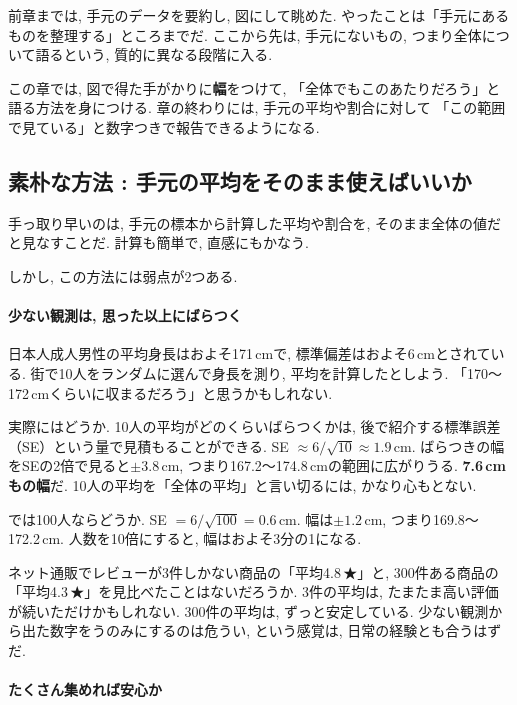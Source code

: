     前章までは, 手元のデータを要約し, 図にして眺めた.
    やったことは「手元にあるものを整理する」ところまでだ.
    ここから先は, 手元にないもの, つまり全体について語るという, 質的に異なる段階に入る.

    この章では, 図で得た手がかりに\textbf{幅}をつけて,
    「全体でもこのあたりだろう」と語る方法を身につける.
    章の終わりには, 手元の平均や割合に対して
    「この範囲で見ている」と数字つきで報告できるようになる.


  \subsection{素朴な方法 : 手元の平均をそのまま使えばいいか}

    手っ取り早いのは, 手元の標本から計算した平均や割合を, そのまま全体の値だと見なすことだ.
    計算も簡単で, 直感にもかなう.

    しかし, この方法には弱点が2つある.

    \paragraph{少ない観測は, 思った以上にばらつく}

    日本人成人男性の平均身長はおよそ171\,cmで, 標準偏差はおよそ6\,cmとされている.
    街で10人をランダムに選んで身長を測り, 平均を計算したとしよう.
    「170〜172\,cmくらいに収まるだろう」と思うかもしれない.

    実際にはどうか.
    10人の平均がどのくらいばらつくかは, 後で紹介する標準誤差（SE）という量で見積もることができる.
    SE $\approx 6/\sqrt{10} \approx 1.9$\,cm.
    ばらつきの幅をSEの2倍で見ると$\pm 3.8$\,cm, つまり167.2〜174.8\,cmの範囲に広がりうる.
    \textbf{7.6\,cmもの幅}だ.
    10人の平均を「全体の平均」と言い切るには, かなり心もとない.

    では100人ならどうか.
    SE $= 6/\sqrt{100} = 0.6$\,cm.
    幅は$\pm 1.2$\,cm, つまり169.8〜172.2\,cm.
    人数を10倍にすると, 幅はおよそ3分の1になる.

    ネット通販でレビューが3件しかない商品の「平均4.8\,★」と, 300件ある商品の「平均4.3\,★」を見比べたことはないだろうか.
    3件の平均は, たまたま高い評価が続いただけかもしれない.
    300件の平均は, ずっと安定している.
    少ない観測から出た数字をうのみにするのは危うい, という感覚は, 日常の経験とも合うはずだ.

    \paragraph{たくさん集めれば安心か}

